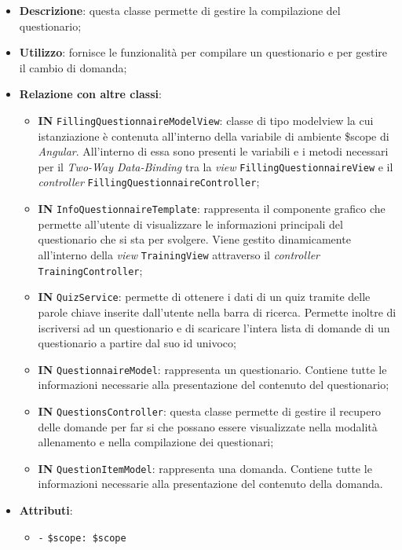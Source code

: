 \begin{itemize}
	\item \textbf{Descrizione}: questa classe permette di gestire la compilazione del questionario;
	\item \textbf{Utilizzo}: fornisce le funzionalità per compilare un questionario e per gestire il cambio di domanda;
	\item \textbf{Relazione con altre classi}:
	\begin{itemize}
		\item \textbf{IN} \texttt{FillingQuestionnaireModelView}: classe di tipo modelview la cui istanziazione è contenuta all'interno della variabile di ambiente \$scope di \textit{Angular}. All'interno di essa sono presenti le variabili e i metodi necessari per il \textit{Two-Way Data-Binding} tra la \textit{view} \texttt{FillingQuestionnaireView} e il \textit{controller} \texttt{FillingQuestionnaireController};  
		\item \textbf{IN} \texttt{InfoQuestionnaireTemplate}: rappresenta il componente grafico che permette all'utente di visualizzare le informazioni principali del questionario che si sta per svolgere. Viene gestito dinamicamente all'interno della \textit{view} \texttt{TrainingView} attraverso il \textit{controller} \texttt{TrainingController};
		\item \textbf{IN} \texttt{QuizService}: permette di ottenere i dati di un quiz tramite delle parole chiave inserite dall'utente nella barra di ricerca. Permette inoltre di iscriversi ad un questionario e di scaricare l'intera lista di domande di un questionario a partire dal suo id univoco;
		\item \textbf{IN} \texttt{QuestionnaireModel}: rappresenta un questionario. Contiene tutte le informazioni necessarie alla presentazione del contenuto del questionario;
		\item \textbf{IN} \texttt{QuestionsController}: questa classe permette di gestire il recupero delle domande per far si che possano essere visualizzate nella modalità allenamento e nella compilazione dei questionari; 
		\item \textbf{IN} \texttt{QuestionItemModel}: rappresenta una domanda. Contiene tutte le informazioni necessarie alla presentazione del contenuto della domanda.
	\end{itemize}
	\item \textbf{Attributi}:
	\begin{itemize}
		\item \texttt{-} \texttt{\$scope: \$scope} \\

\end{itemize}
\end{itemize}
